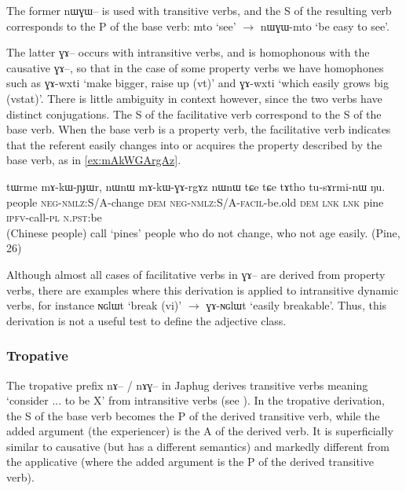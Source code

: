 \documentclass[oldfontcommands,oneside,a4paper,11pt]{article}
\newcommand{\ipa}[1]{{\phon \mbox{#1}}} %
\begin{document}
 The former \ipa{nɯɣɯ--} is used with transitive verbs, and the S of the resulting verb corresponds to the P of the base verb: \ipa{mto} `see' $\rightarrow$ \ipa{nɯɣɯ-mto} `be easy to see'. 

The latter  \ipa{ɣɤ--} occurs with intransitive verbs, and is homophonous with the causative \ipa{ɣɤ--}, so that in the case of some property verbs we have homophones such as \ipa{ɣɤ-wxti} `make bigger, raise up (vt)' and \ipa{ɣɤ-wxti} `which easily grows big (vstat)'. There is little ambiguity in context however, since the two verbs have distinct conjugations. The S of the facilitative verb  correspond to the S of the base verb. When the base verb is a property verb, the facilitative verb indicates that the referent easily changes into or acquires the property described by the base verb, as in \ref{ex:mAkWGArgAz}.

\begin{exe}
\ex \label{ex:mAkWGArgAz}
\gll 
\ipa{tɯrme}  	\ipa{mɤ-kɯ-ɲɟɯr,}  	\ipa{nɯnɯ}  	\ipa{mɤ-kɯ-ɣɤ-rgɤz}  	\ipa{nɯnɯ}    \ipa{tɕe}	   \ipa{tɕe}	\ipa{tɤtho}  	\ipa{tu-sɤrmi-nɯ}  	\ipa{ŋu.}  \\
people \textsc{neg-nmlz:S/A}-change \textsc{dem} \textsc{neg-nmlz:S/A-facil}-be.old \textsc{dem} \textsc{lnk} \textsc{lnk}
pine \textsc{ipfv}-call-\textsc{pl} \textsc{n.pst}:be \\
\glt (Chinese people) call `pines' people who do not change, who not age easily. (Pine, 26)
\end{exe}

Although almost all cases of facilitative verbs in \ipa{ɣɤ--} are derived from property verbs, there are examples where this derivation is applied to intransitive dynamic verbs, for instance \ipa{ɴɢlɯt}  `break (vi)' $\rightarrow$ \ipa{ɣɤ-ɴɢlɯt} `easily breakable'. Thus, this derivation is not a useful test to define the adjective class.

\subsubsection{Tropative} \label{sec:tropative}
The tropative prefix \ipa{nɤ--} / \ipa{nɤɣ--} in Japhug derives transitive verbs meaning `consider ... to be X' from intransitive verbs (see \citealt{jacques13tropative}). In the tropative derivation,   the S of the base verb becomes the P of the derived transitive verb, while the added argument (the experiencer) is the A of the derived verb. It is superficially similar to causative (but has a different semantics) and markedly different from the applicative (where the added argument is the P of the derived transitive verb). 
\end{document}
